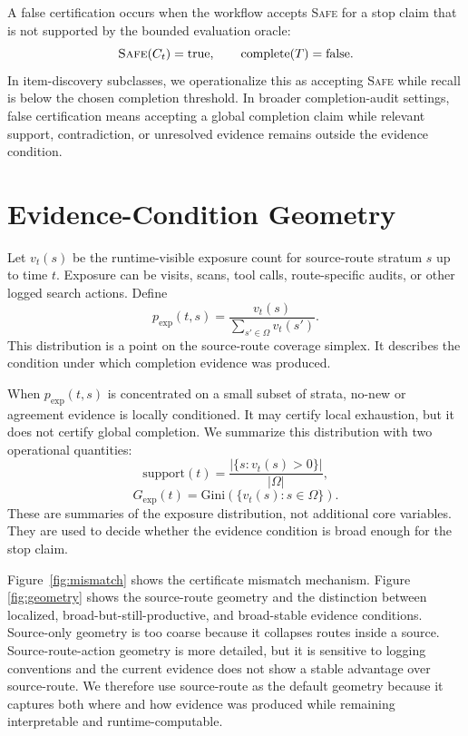 \documentclass[letterpaper,10pt,twocolumn]{article}
\newcommand{\safe}{\textsc{Safe}}
\newcommand{\pexp}{p_{\mathrm{exp}}}
\newcommand{\gexp}{G_{\mathrm{exp}}}
\newcommand{\sr}{\mathrm{support}}
\begin{document}
A false certification occurs when the workflow accepts \safe{} for a stop claim
that is not supported by the bounded evaluation oracle:
\[
\safe(C_t)=\mathrm{true},\qquad
\mathrm{complete}(T)=\mathrm{false}.
\]
In item-discovery subclasses, we operationalize this as accepting \safe{} while
recall is below the chosen completion threshold. In broader completion-audit
settings, false certification means accepting a global completion claim while
relevant support, contradiction, or unresolved evidence remains outside the
evidence condition.

\section{Evidence-Condition Geometry}

Let \(v_t(s)\) be the runtime-visible exposure count for source-route stratum
\(s\) up to time \(t\). Exposure can be visits, scans, tool calls,
route-specific audits, or other logged search actions. Define
\[
\pexp(t,s)=\frac{v_t(s)}{\sum_{s'\in\Omega} v_t(s')}.
\]
This distribution is a point on the source-route coverage simplex. It describes
the condition under which completion evidence was produced.

When \(\pexp(t,s)\) is concentrated on a small subset of strata, no-new or
agreement evidence is locally conditioned. It may certify local exhaustion, but
it does not certify global completion. We summarize this distribution with two
operational quantities:
\[
\sr(t)=\frac{|\{s:v_t(s)>0\}|}{|\Omega|},
\]
\[
\gexp(t)=\mathrm{Gini}(\{v_t(s):s\in\Omega\}).
\]
These are summaries of the exposure distribution, not additional core variables.
They are used to decide whether the evidence condition is broad enough for the
stop claim.

Figure~\ref{fig:mismatch} shows the certificate mismatch mechanism. Figure
\ref{fig:geometry} shows the source-route geometry and the distinction between
localized, broad-but-still-productive, and broad-stable evidence conditions.
Source-only geometry is too coarse because it collapses routes inside a source.
Source-route-action geometry is more detailed, but it is sensitive to logging
conventions and the current evidence does not show a stable advantage over
source-route. We therefore use source-route as the default geometry because it
captures both where and how evidence was produced while remaining interpretable
and runtime-computable.
\end{document}
